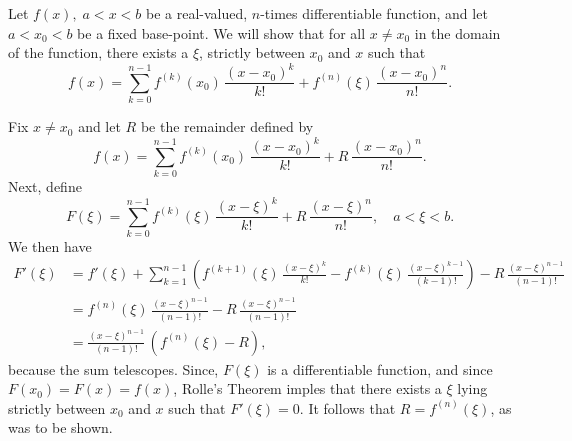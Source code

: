\documentclass[12pt]{article}
\begin{document}
Let $f(x),\; a<x<b$ be a real-valued, $n$-times differentiable
function, and let $a<x_0<b$ be a  fixed base-point. We will show that
for all $x\neq x_0$ in the domain of the 
function, there exists a $\xi$, strictly between $x_0$ and $x$ such
that $$f(x) = \sum_{k=0}^{n-1} f^{(k)}(x_0)\, \frac{(x-x_0)^k}{k!}
+ f^{(n)}(\xi)\,\frac{(x-x_0)^n}{n!}.$$

Fix $x\neq x_0$ and let $R$ be the remainder defined by
$$f(x) = \sum_{k=0}^{n-1} f^{(k)}(x_0)\, \frac{(x-x_0)^k}{k!} +
R\,\frac{(x-x_0)^n}{n!}.$$
Next, define
$$F(\xi) = \sum_{k=0}^{n-1} f^{(k)}(\xi)\, \frac{(x-\xi)^k}{k!} +
R\,\frac{(x-\xi)^n}{n!},\quad a<\xi<b.$$
We then have
\begin{align*}
F'(\xi) &= f'(\xi)+\sum_{k=1}^{n-1} \left(f^{(k+1)}(\xi)\, \frac{(x-\xi)^k}{k!}
   - f^{(k)}(\xi)\, \frac{(x-\xi)^{k-1}}{(k-1)!}\right)
- R\,\frac{(x-\xi)^{n-1}}{(n-1)!}\\
&= f^{(n)}(\xi)\, \frac{(x-\xi)^{n-1}}{(n-1)!}-
R\,\frac{(x-\xi)^{n-1}}{(n-1)!} \\
&=  \frac{(x-\xi)^{n-1}}{(n-1)!}\, ( f^{(n)}(\xi)-R),
\end{align*}
because the sum telescopes.
Since, $F(\xi)$ is a differentiable function, and since
$F(x_0)=F(x)=f(x)$, Rolle's Theorem imples that there exists a $\xi$ lying
strictly between $x_0$ and $x$ such that $F'(\xi)=0$.  It follows that
$R=f^{(n)}(\xi)$, as was to be shown.
\end{document}

